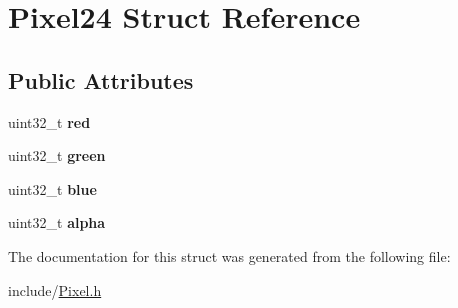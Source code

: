 \hypertarget{structPixel24}{}\section{Pixel24 Struct Reference}
\label{structPixel24}
\subsection*{Public Attributes}
\begin{DoxyCompactItemize}
\item 
\mbox{\label{structPixel24_a7fc50a2748f786a5c69c60dc46903fb5}} 
uint32\+\_\+t {\bfseries red}
\item 
\mbox{\label{structPixel24_abb77563b1e1d3e88874565aa3bb50eb5}} 
uint32\+\_\+t {\bfseries green}
\item 
\mbox{\label{structPixel24_a1fd19f47bd7f723f8033112497cb6831}} 
uint32\+\_\+t {\bfseries blue}
\item 
\mbox{\label{structPixel24_ae8fd7ef8593412a9ee266e38de4a1bbd}} 
uint32\+\_\+t {\bfseries alpha}
\end{DoxyCompactItemize}


The documentation for this struct was generated from the following file\+:\begin{DoxyCompactItemize}
\item 
include/\hyperlink{Pixel_8h}{Pixel.\+h}\end{DoxyCompactItemize}
